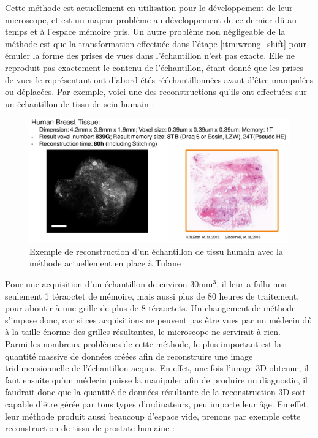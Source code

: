 \documentclass[utf8]{stageM2R}
\begin{document}
{{			Cette méthode est actuellement en utilisation pour le développement de leur microscope, et est un majeur problème au développement de ce dernier dû au temps et à l'espace mémoire pris. Un autre problème non négligeable de la méthode est que la transformation effectuée dans l'étape \ref{itm:wrong_shift} pour émuler la forme des prises de vues dans l'échantillon n'est pas exacte. Elle ne reproduit pas exactement le contenu de l'échantillon, étant donné que les prises de vues le représentant ont d'abord étés rééchantillonnées avant d'être manipulées ou déplacées.
			Par exemple, voici une des reconstructions qu'ils ont effectuées sur un échantillon de tissu de sein humain :

			\begin{figure}[H]
				\centering
				\includegraphics[width=0.8\linewidth]{./img/tulane_reconstruction_02_breast.png}
				\caption{Exemple de reconstruction d'un échantillon de tissu humain avec la méthode actuellement en place à Tulane}
				\label{ref_tulane_recon_02_breast}
			\end{figure}

			Pour une acquisition d'un échantillon de environ $30\text{mm}^3$, il leur a fallu non seulement 1 téraoctet de mémoire, mais aussi plus de 80 heures de traitement, pour aboutir à une grille de plus de 8 téraoctets. Un changement de méthode s'impose donc, car si ces acquisitions ne peuvent pas être vues par un médecin dû à la taille énorme des grilles résultantes, le microscope ne servirait à rien.\\

			Parmi les nombreux problèmes de cette méthode, le plus important est la quantité massive de données créées afin de reconstruire une image tridimensionnelle de l'échantillon acquis. En effet, une fois l'image 3D obtenue, il faut ensuite qu'un médecin puisse la manipuler afin de produire un diagnostic, il faudrait donc que la quantité de données résultante de la reconstruction 3D soit capable d'être gérée par tous types d'ordinateurs, peu importe leur âge. En effet, leur méthode produit aussi beaucoup d'espace vide, prenons par exemple cette reconstruction de tissu de prostate humaine :

}}
\end{document}
